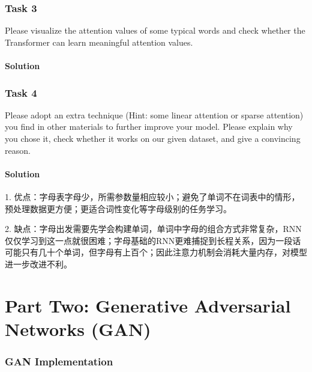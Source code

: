 \documentclass[
	12pt,
]{fphw}
\begin{document}
\section*{Task 3}

\begin{problem}
	\medskip
		\quad Please visualize the attention values of some typical words and check whether the Transformer can learn meaningful attention values.
	\end{problem}


\subsection*{Solution}





\section*{Task 4}

\begin{problem}
	\medskip
		\quad Please adopt an extra technique (Hint: some linear attention or sparse attention) you find in other materials to further improve your model. Please explain why you chose it, check whether it works on our given dataset, and give a convincing reason.
	\end{problem}

\subsection*{Solution}
\par
1. 优点：字母表字母少，所需参数量相应较小；避免了单词不在词表中的情形，预处理数据更方便；更适合词性变化等字母级别的任务学习。

\par
2. 缺点：字母出发需要先学会构建单词，单词中字母的组合方式非常复杂，RNN仅仅学习到这一点就很困难；字母基础的RNN更难捕捉到长程关系，因为一段话可能只有几十个单词，但字母有上百个；因此注意力机制会消耗大量内存，对模型进一步改进不利。



\part*{Part Two: Generative Adversarial Networks (GAN)}

\section*{GAN Implementation}
\end{document}
